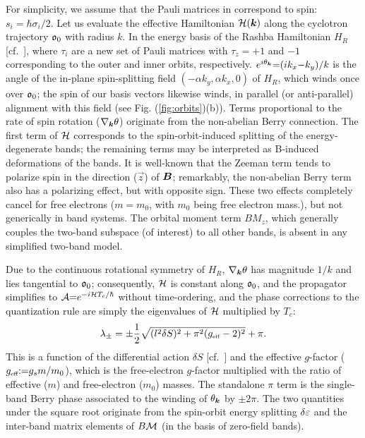 \documentclass[aps, prb, showpacs, twocolumn, notitlepage, superscriptaddress]{revtex4-1}
\begin{document}
For simplicity, we assume that the Pauli matrices in  correspond to spin: $s_i{=}\hbar \sigma_i/2$. Let us evaluate the effective Hamiltonian ${\cal H}(\boldsymbol{k})$  along the cyclotron trajectory $\mathfrak{o}_0$ with radius $k$. In the  energy basis of the Rashba Hamiltonian $H_R$ [cf.\ ], 
where $\tau_i$ are a new set of Pauli matrices with $\tau_z{=}{+} 1$ and ${-}1$ corresponding to the outer and inner orbits, respectively. $e^{i\theta_{\boldsymbol{k}}}{=}(ik_x{-}k_y)/k$ is the angle of the in-plane spin-splitting field $({-}\alpha k_y,\alpha k_x,0)$ of $H_R$, which winds once over $\mathfrak{o}_0$; the spin of our basis vectors likewise winds, in parallel (or anti-parallel) alignment with this field (see Fig. (\ref{fig:orbits})(b)). Terms proportional to the rate of spin rotation  ($\nabla_{\boldsymbol{k}} \theta$) originate from the non-abelian Berry connection. The first term of  ${\cal H}$ corresponds to the spin-orbit-induced splitting of the energy-degenerate bands;
the remaining terms may be interpreted as B-induced deformations of the bands.   It is well-known that the Zeeman term tends to polarize spin in the direction ($\vec{z}$) of $\boldsymbol{B}$; remarkably, the non-abelian Berry term   also has a polarizing effect, but with opposite sign. These two effects completely cancel for free electrons ($m{=}m_0$, with $m_0$ being free electron mass.), but not generically in band systems. The orbital moment term $B M_z$, which generally couples the two-band subspace (of interest) to all other bands, is absent in any simplified two-band model.

Due to the continuous rotational symmetry of $H_R$, $\nabla_{\boldsymbol{k}} \theta$ has magnitude $1/k$ and lies tangential to $\mathfrak{o}_0$; consequently, ${\cal H}$ is constant along $\mathfrak{o}_0$, and the propagator simplifies to ${\cal A}{=}e^{{-}i{\cal H} T_c/\hbar}$ without time-ordering, and the phase corrections to the quantization rule are simply the eigenvalues of ${\cal H}$ multiplied by $T_c$:
\begin{equation}
\lambda_{\pm}=\pm\frac{1}{2}\sqrt{({l^2\delta S})^2+\pi^2(g_{\scriptscriptstyle{\text{eff}}}-2)^2}+\pi. \label{eq:Rashba-lambda}
\end{equation}
This is a function of the differential action $\delta S$ [cf.\ ] and  the effective  $g$-factor ($g_{\scriptscriptstyle{\text{eff}}}{:}{=}g_sm/m_0$), which is the free-electron $g$-factor multiplied with the ratio of  effective ($m$) and free-electron ($m_0$) masses. The standalone $\pi$ term is the single-band Berry phase associated to the winding of $\theta_{\boldsymbol{k}}$ by ${\pm}2\pi$. The two quantities under the square root originate from the spin-orbit energy splitting $\delta \varepsilon$ and the inter-band matrix elements of $B{\cal M}$ (in the basis of zero-field bands). 
\end{document}

